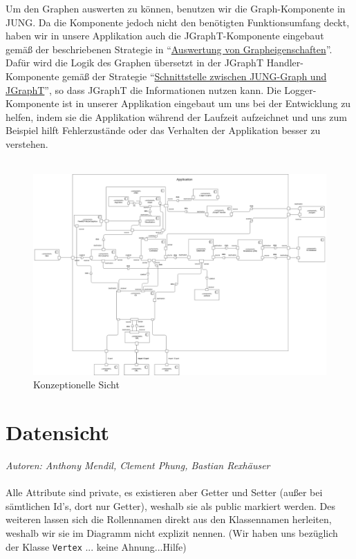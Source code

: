 \documentclass[enabledeprecatedfontcommands,fontsize=11pt,paper=a4,twoside]{scrartcl}
\newcounter{one}
\begin{document}
Um den Graphen auswerten zu können, benutzen wir die Graph-Komponente in JUNG. Da die Komponente jedoch nicht den benötigten Funktionsumfang deckt, haben wir in unsere Applikation auch die JGraphT-Komponente eingebaut gemäß der beschriebenen Strategie in “\hyperlink{fff}{Auswertung von Grapheigenschaften}”. Dafür wird die Logik des Graphen übersetzt in der JGraphT Handler-Komponente gemäß der Strategie “\hyperlink{yyy}{Schnittstelle zwischen JUNG-Graph und JGraphT}”, so dass JGraphT die Informationen nutzen kann.
Die Logger-Komponente ist in unserer Applikation eingebaut um uns bei der Entwicklung zu helfen, indem sie die Applikation während der Laufzeit aufzeichnet und uns zum Beispiel hilft Fehlerzustände oder das Verhalten der Applikation besser zu verstehen.\\ \\
\newpage
\begin{figure}[ht]
	\centering
	\includegraphics[width=1\textwidth]{KonzeptionelleSicht.png}
	\caption{Konzeptionelle Sicht}
\end{figure}



\newpage
\section{Datensicht}
\label{sec:datensicht}

\emph{Autoren: Anthony Mendil, Clement Phung, Bastian Rexhäuser}\\ \\

Alle Attribute sind private, es existieren aber Getter und Setter (außer bei sämtlichen Id's, dort nur Getter), weshalb sie als public markiert werden. Des weiteren lassen sich die Rollennamen direkt aus den Klassennamen herleiten, weshalb wir sie im Diagramm nicht explizit nennen. (Wir haben uns bezüglich der Klasse \texttt{Vertex} ... keine Ahnung...Hilfe)
\end{document}
